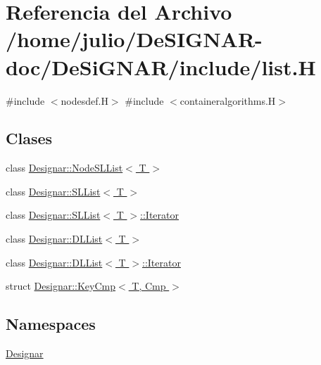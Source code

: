 \hypertarget{list_8_h}{}\section{Referencia del Archivo /home/julio/\+De\+S\+I\+G\+N\+A\+R-\/doc/\+De\+Si\+G\+N\+A\+R/include/list.H}
\label{list_8_h}
{\ttfamily \#include $<$nodesdef.\+H$>$}\newline
{\ttfamily \#include $<$containeralgorithms.\+H$>$}\newline
\subsection*{Clases}
\begin{DoxyCompactItemize}
\item 
class \hyperlink{class_designar_1_1_node_s_l_list}{Designar\+::\+Node\+S\+L\+List$<$ T $>$}
\item 
class \hyperlink{class_designar_1_1_s_l_list}{Designar\+::\+S\+L\+List$<$ T $>$}
\item 
class \hyperlink{class_designar_1_1_s_l_list_1_1_iterator}{Designar\+::\+S\+L\+List$<$ T $>$\+::\+Iterator}
\item 
class \hyperlink{class_designar_1_1_d_l_list}{Designar\+::\+D\+L\+List$<$ T $>$}
\item 
class \hyperlink{class_designar_1_1_d_l_list_1_1_iterator}{Designar\+::\+D\+L\+List$<$ T $>$\+::\+Iterator}
\item 
struct \hyperlink{struct_designar_1_1_key_cmp}{Designar\+::\+Key\+Cmp$<$ T, Cmp $>$}
\end{DoxyCompactItemize}
\subsection*{Namespaces}
\begin{DoxyCompactItemize}
\item 
 \hyperlink{namespace_designar}{Designar}
\end{DoxyCompactItemize}
